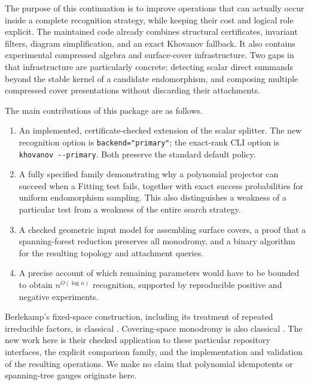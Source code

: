 \documentclass[11pt,a4paper]{article}
\theoremstyle{definition}\newtheorem{definition}[theorem]{Definition}
\theoremstyle{remark}\newtheorem{remark}[theorem]{Remark}
\newcommand{\code}[1]{\nolinkurl{#1}}
\begin{document}
The purpose of this continuation is to improve operations that can actually
occur inside a complete recognition strategy, while keeping their cost and
logical role explicit. The maintained code already combines structural
certificates, invariant filters, diagram simplification, and an exact
Khovanov fallback. It also contains experimental compressed algebra and
surface-cover infrastructure. Two gaps in that infrastructure are particularly
concrete: detecting scalar direct summands beyond the stable kernel of a
candidate endomorphism, and composing multiple compressed cover presentations
without discarding their attachments.

The main contributions of this package are as follows.
\begin{enumerate}
\item An implemented, certificate-checked extension of the scalar splitter.
The new recognition option is \code{backend="primary"}; the exact-rank CLI
option is \code{khovanov --primary}. Both preserve the standard default policy.
\item A fully specified family demonstrating why a polynomial projector can
succeed when a Fitting test fails, together with exact success probabilities
for uniform endomorphism sampling. This also distinguishes a weakness of a
particular test from a weakness of the entire search strategy.
\item A checked geometric input model for assembling surface covers, a proof
that a spanning-forest reduction preserves all monodromy, and a binary
algorithm for the resulting topology and attachment queries.
\item A precise account of which remaining parameters would have to be
bounded to obtain $n^{O(\log n)}$ recognition, supported by reproducible
positive and negative experiments.
\end{enumerate}

Berlekamp's fixed-space construction, including its treatment of repeated
irreducible factors, is classical \cite{berlekamp}. Covering-space monodromy is
also classical \cite{hatcher}. The new work here is their checked application
to these particular repository interfaces, the explicit comparison family,
and the implementation and validation of the resulting operations. We make
no claim that polynomial idempotents or spanning-tree gauges originate here.
\end{document}
